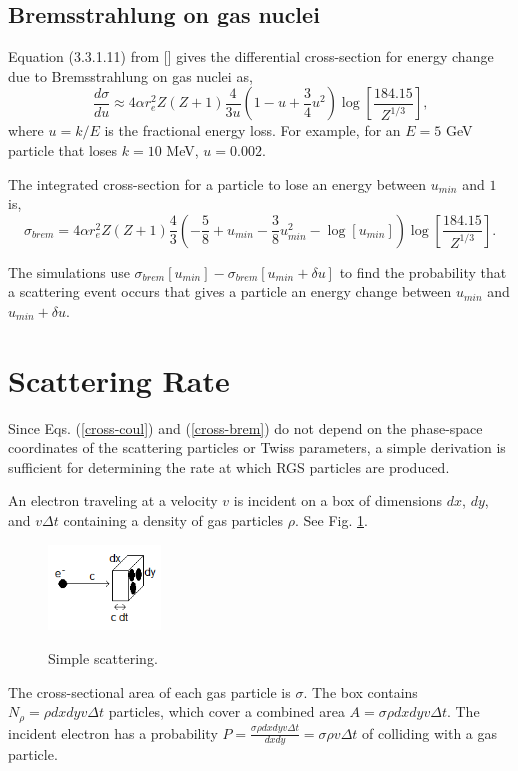 \documentclass[a4paper,10pt]{article}
\begin{document}
\subsection{Bremsstrahlung on gas nuclei}

Equation (3.3.1.11) from [\cite{hb}] gives the differential cross-section for energy change due to Bremsstrahlung on gas nuclei as,
\begin{equation}
\frac{d\sigma}{du}\approx 4\alpha r_e^2 Z\left(Z+1\right)\frac{4}{3 u}\left(1-u+\frac{3}{4}u^2\right)
\log\left[\frac{184.15}{Z^{1/3}}\right]\textrm{,}
\end{equation}
where $u=k/E$ is the fractional energy loss.  For example, for an $E=5$ GeV particle that loses $k=10$ MeV, $u=0.002$.

The integrated cross-section for a particle to lose an energy between $u_{min}$ and $1$ is,
\begin{equation}
\sigma_{brem}=4\alpha r_e^2 Z(Z+1)\frac{4}{3}\left(-\frac{5}{8}+u_{min}-\frac{3}{8}u_{min}^2-\log\left[u_{min}\right]\right)
\log\left[\frac{184.15}{Z^{1/3}}\right]\textrm{.}
\label{cross-brem}
\end{equation}

The simulations use $\sigma_{brem}\left[u_{min}\right]-\sigma_{brem}\left[u_{min}+\delta u\right]$ to find the probability that
a scattering event occurs that gives a particle an energy change between $u_{min}$ and $u_{min}+\delta u$.

\section{Scattering Rate}

Since Eqs. (\ref{cross-coul}) and (\ref{cross-brem}) do not depend on the phase-space coordinates of the scattering particles or Twiss parameters, a simple derivation is sufficient for determining the rate at which RGS particles are produced.

An electron traveling at a velocity $v$ is incident on a box of dimensions $dx$, $dy$, and $v \Delta t$ containing a density of gas particles $\rho$.  See Fig. \ref{simple-scattering}.
\begin{figure}[h]
  \centering
  \includegraphics[width=3cm]{simple_scattering.png}\\
  \caption{Simple scattering.}
  \label{simple-scattering}
\end{figure}
The cross-sectional area of each gas particle is $\sigma$.  The box contains $N_\rho=\rho dx dy v \Delta t$ particles, which cover a combined area $A = \sigma\rho dx dy v \Delta t$.  The incident electron has a probability $P=\frac{\sigma\rho dx dy v \Delta t}{dx dy} = \sigma\rho v \Delta t$ of colliding with a gas particle.
\end{document}
